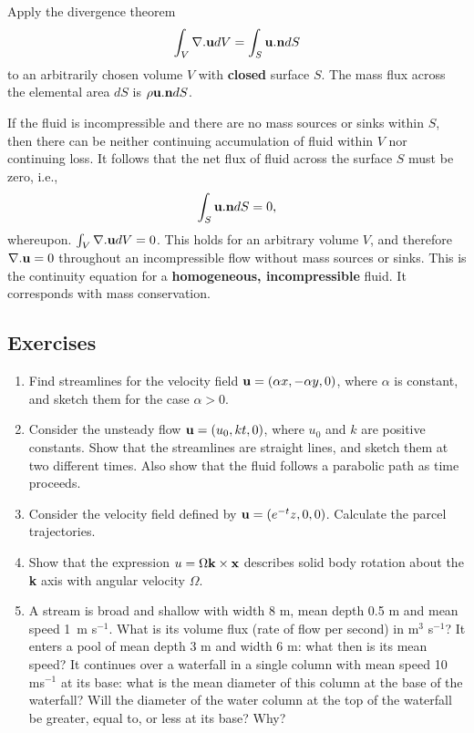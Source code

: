 \documentclass[twoside,a4paper,11pt]{report}
\begin{document}
Apply the divergence theorem
\[
\int_V {\nabla . {\bf u} } dV=\int_S {\bf u} . {\bf n}dS
\]
to an arbitrarily chosen volume $V$ with \textbf{closed} surface $S$. 
The mass flux across the elemental area $dS$ is $\rho {\bf u}. 
{\bf n}dS$.

If the fluid is incompressible and there are no mass sources or sinks within 
$S$, then there can be neither continuing accumulation of fluid within $V$ nor 
continuing loss. It follows that the net flux of fluid across the surface $S$ 
must be zero, i.e.,
\[
\int_S  {\bf u} . {\bf n}dS=0,
\]
whereupon. $\int_V {\nabla . {\bf u} } dV=0$. This holds for an 
arbitrary volume $V$, and therefore $\nabla . {\bf u}=0$ throughout an 
incompressible flow without mass sources or sinks. This is the continuity 
equation for a \textbf{homogeneous, incompressible} fluid. It corresponds 
with mass conservation.

\subsection*{Exercises}
\begin{enumerate}
\item Find streamlines for the velocity field ${{\bf u}}=(\alpha x,-\alpha
y,0)$, where $\alpha $ is constant, and sketch them for the case $\alpha > 0$.
\item Consider the unsteady flow ${{\bf u}}=(u_0 ,kt,0)$, where $u_{0}$ and
$k$ are positive constants. Show that the streamlines are straight lines, and
sketch them at two different times. Also show that the fluid follows a
parabolic path as time proceeds. 
\item Consider the velocity field defined by
${{\bf u}}=(e^{-t}z,0,0)$. Calculate the parcel trajectories. 
\item Show that
the expression $u=\Omega {\bf k}\times {\bf x}$ describes solid body rotation
about the\textbf{ k} axis with angular velocity $\Omega $. 
\item A stream is
broad and shallow with width 8 m, mean depth 0.5 m and mean speed 1~m
s$^{-1}$. What is its volume flux (rate of flow per second) in m$^{3}$
s$^{-1}$? It enters a pool of mean depth 3 m and width 6 m: what then is its
mean speed? It continues over a waterfall in a single column with mean speed
10 ms$^{-1}$ at its base: what is the mean diameter of this column at the base
of the waterfall? Will the diameter of the water column at the top of the
waterfall be greater, equal to, or less at its base? Why? 
\end{enumerate}
\end{document}
